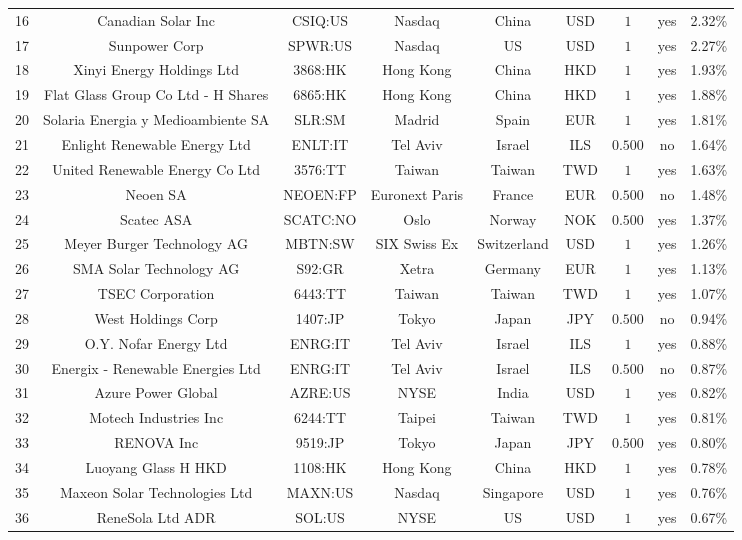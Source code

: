 \begin{table}[!htbp]
\begin{tabular}{@{\extracolsep{5pt}} ccccccccc}
16 & Canadian Solar Inc & CSIQ:US & Nasdaq & China & USD & $1$ & yes & 2.32\% \\ 
17 & Sunpower Corp & SPWR:US & Nasdaq & US & USD & $1$ & yes & 2.27\% \\ 
18 & Xinyi Energy Holdings Ltd & 3868:HK & Hong Kong & China & HKD & $1$ & yes & 1.93\% \\ 
19 & Flat Glass Group Co Ltd - H Shares & 6865:HK & Hong Kong & China & HKD & $1$ & yes & 1.88\% \\ 
20 & Solaria Energia y Medioambiente SA & SLR:SM & Madrid & Spain & EUR & $1$ & yes & 1.81\% \\ 
21 & Enlight Renewable Energy Ltd & ENLT:IT & Tel Aviv & Israel & ILS & $0.500$ & no & 1.64\% \\ 
22 & United Renewable Energy Co Ltd & 3576:TT & Taiwan & Taiwan & TWD & $1$ & yes & 1.63\% \\ 
23 & Neoen SA & NEOEN:FP & Euronext Paris & France & EUR & $0.500$ & no & 1.48\% \\ 
24 & Scatec ASA & SCATC:NO & Oslo & Norway & NOK & $0.500$ & yes & 1.37\% \\ 
25 & Meyer Burger Technology AG & MBTN:SW & SIX Swiss Ex & Switzerland & USD & $1$ & yes & 1.26\% \\ 
26 & SMA Solar Technology AG & S92:GR & Xetra & Germany & EUR & $1$ & yes & 1.13\% \\ 
27 & TSEC Corporation & 6443:TT & Taiwan & Taiwan & TWD & $1$ & yes & 1.07\% \\ 
28 & West Holdings Corp & 1407:JP & Tokyo & Japan & JPY & $0.500$ & no & 0.94\% \\ 
29 & O.Y. Nofar Energy Ltd & ENRG:IT & Tel Aviv & Israel & ILS & $1$ & yes & 0.88\% \\ 
30 & Energix - Renewable Energies Ltd & ENRG:IT & Tel Aviv & Israel & ILS & $0.500$ & no & 0.87\% \\ 
31 & Azure Power Global & AZRE:US & NYSE & India & USD & $1$ & yes & 0.82\% \\ 
32 & Motech Industries Inc & 6244:TT & Taipei & Taiwan & TWD & $1$ & yes & 0.81\% \\ 
33 & RENOVA Inc & 9519:JP & Tokyo & Japan & JPY & $0.500$ & yes & 0.80\% \\ 
34 & Luoyang Glass H HKD & 1108:HK & Hong Kong & China & HKD & $1$ & yes & 0.78\% \\ 
35 & Maxeon Solar Technologies Ltd & MAXN:US & Nasdaq & Singapore & USD & $1$ & yes & 0.76\% \\ 
36 & ReneSola Ltd ADR & SOL:US & NYSE & US & USD & $1$ & yes & 0.67\% \\ 

\end{tabular}
\end{table}
